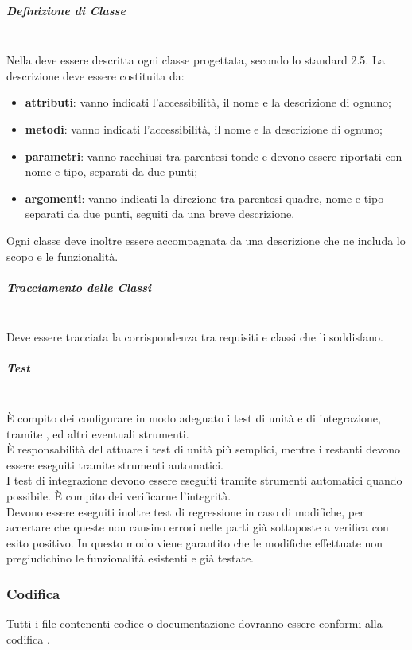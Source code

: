 \subparagraph{Definizione di Classe}\mbox{}\\
Nella \DefinizioneDiProdotto{} deve essere descritta ogni classe progettata, secondo lo standard  2.5. La descrizione deve essere costituita da:
\begin{itemize}
	\item \textbf{attributi}: vanno indicati l'accessibilità, il nome e la descrizione di ognuno;
	\item \textbf{metodi}: vanno indicati l'accessibilità, il nome e la descrizione di ognuno;
	\item \textbf{parametri}: vanno racchiusi tra parentesi tonde e devono essere riportati con nome e tipo, separati da due punti;
	\item \textbf{argomenti}: vanno indicati la direzione tra parentesi quadre, nome e tipo separati da due punti, seguiti da una breve descrizione.
\end{itemize}
Ogni classe deve inoltre essere accompagnata da una descrizione che ne includa lo scopo e le funzionalità.

\subparagraph{Tracciamento delle Classi}\mbox{}\\
Deve essere tracciata la corrispondenza tra requisiti e classi che li soddisfano.

\subparagraph{Test}\mbox{}\\
\`{E} compito dei \Progettisti{} configurare in modo adeguato i test di unità e di integrazione, tramite ,  ed altri eventuali strumenti.\\
\`{E} responsabilità del \Programmatore{} attuare i test di unità più semplici, mentre i restanti devono essere eseguiti tramite strumenti automatici.\\
I test di integrazione devono essere eseguiti tramite strumenti automatici quando possibile. \`{E} compito dei \Verificatori{} verificarne l'integrità.\\
Devono essere eseguiti inoltre test di regressione in caso di modifiche, per accertare che queste non causino errori nelle parti già sottoposte a verifica con esito positivo. In questo modo viene garantito che le modifiche effettuate non pregiudichino le funzionalità esistenti e già testate.

\subsubsection{Codifica}
Tutti i file contenenti codice o documentazione dovranno essere conformi alla codifica .

